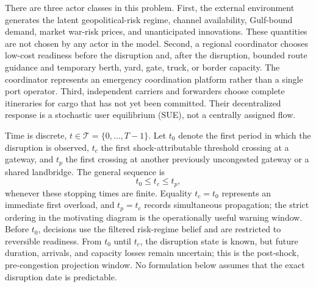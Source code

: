\documentclass[a4paper,fleqn]{cas-sc}
\begin{document}
There are three actor classes in this problem. First, the external environment generates
the latent geopolitical-risk regime, channel availability, Gulf-bound demand,
market war-risk prices, and unanticipated innovations. These quantities are not
chosen by any actor in the model. Second, a regional coordinator chooses
low-cost readiness before the disruption and, after the disruption, bounded
route guidance and temporary berth, yard, gate, truck, or border capacity. The
coordinator represents an emergency coordination platform rather than a single
port operator. Third, independent carriers and forwarders choose complete
itineraries for cargo that has not yet been committed. Their decentralized
response is a stochastic user equilibrium (SUE), not a centrally assigned flow.





Time is discrete, $t\in\mathcal T=\{0,\ldots,T-1\}$. Let $t_0$ denote the first
period in which the disruption is observed, $t_c$ the first shock-attributable
threshold crossing at a gateway, and $t_p$ the first crossing at another
previously uncongested gateway or a shared landbridge. The general sequence is
\begin{equation}
  t_0 \le t_c \le t_p,
  \label{eq:timeline}
\end{equation}
whenever these stopping times are finite. Equality $t_c=t_0$ represents an
immediate first overload, and $t_p=t_c$ records simultaneous propagation; the
strict ordering in the motivating diagram is the operationally useful warning
window. Before $t_0$, decisions use the filtered
risk-regime belief and are restricted to reversible readiness. From $t_0$
until $t_c$, the disruption state is known, but future duration, arrivals, and
capacity losses remain uncertain; this is the post-shock, pre-congestion
projection window. No formulation below assumes that the exact disruption date
is predictable.
\end{document}

